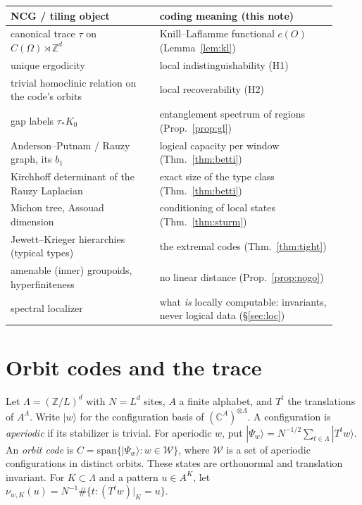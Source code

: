 \documentclass[11pt]{article}
\theoremstyle{definition}
\theoremstyle{remark}
\newcommand{\Z}{\mathbb Z}
\begin{document}
\begin{center}\small
\begin{tabular}{p{0.42\linewidth}p{0.5\linewidth}}
\toprule
NCG / tiling object & coding meaning (this note)\\
\midrule
canonical trace $\tau$ on $C(\Omega)\rtimes\Z^d$ & Knill--Laflamme functional $c(O)$ (Lemma~\ref{lem:kl})\\
unique ergodicity & local indistinguishability (H1)\\
trivial homoclinic relation on the code's orbits & local recoverability (H2)\\
gap labels $\tau_*K_0$ & entanglement spectrum of regions (Prop.~\ref{prop:gl})\\
Anderson--Putnam / Rauzy graph, its $b_1$ & logical capacity per window (Thm.~\ref{thm:betti})\\
Kirchhoff determinant of the Rauzy Laplacian & exact size of the type class (Thm.~\ref{thm:betti})\\
Michon tree, Assouad dimension & conditioning of local states (Thm.~\ref{thm:sturm})\\
Jewett--Krieger hierarchies (typical types) & the extremal codes (Thm.~\ref{thm:tight})\\
amenable (inner) groupoids, hyperfiniteness & no linear distance (Prop.~\ref{prop:nogo})\\
spectral localizer & what \emph{is} locally computable: invariants, never logical data (\S\ref{sec:loc})\\
\bottomrule
\end{tabular}
\end{center}

\section{Orbit codes and the trace}

Let $\Lambda=(\Z/L)^d$ with $N=L^d$ sites, $A$ a finite alphabet, and $T^t$ the translations of $A^\Lambda$. Write $|w\rangle$ for the configuration basis of $(\mathbb C^A)^{\otimes\Lambda}$. A configuration is \emph{aperiodic} if its stabilizer is trivial. For aperiodic $w$, put $|\Psi_w\rangle=N^{-1/2}\sum_{t\in\Lambda}|T^tw\rangle$. An \emph{orbit code} is $C=\mathrm{span}\{|\Psi_w\rangle:w\in\mathcal W\}$, where $\mathcal W$ is a set of aperiodic configurations in distinct orbits. These states are orthonormal and translation invariant. For $K\subset\Lambda$ and a pattern $u\in A^K$, let $\nu_{w,K}(u)=N^{-1}\#\{t:(T^tw)|_K=u\}$.
\end{document}
